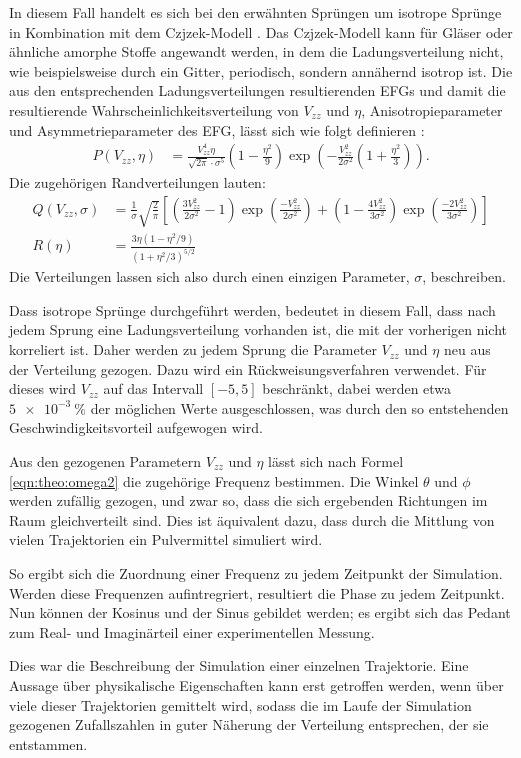 In diesem Fall handelt es sich bei den erwähnten Sprüngen um isotrope Sprünge in Kombination mit dem Czjzek-Modell \cite{czjzek_atomic_1981}. Das Czjzek-Modell kann für Gläser oder ähnliche amorphe Stoffe angewandt werden, in dem die Ladungsverteilung nicht, wie beispielsweise durch ein Gitter, periodisch, sondern annähernd isotrop ist. Die aus den entsprechenden Ladungsverteilungen resultierenden EFGs und damit die resultierende Wahrscheinlichkeitsverteilung von $V_{zz}$ und $\eta$, Anisotropieparameter und Asymmetrieparameter des EFG, lässt sich wie folgt definieren \cite{caer}:
\begin{align}
	P \left( V_{zz}, \eta \right) & = \frac{V_{zz}^4 \eta}{\sqrt{2 \pi} \cdot \sigma^5} \left( 1 - \frac{\eta^2}{9} \right)\exp \left( - \frac{V_{zz}^2}{2 \sigma^2} \left( 1 + \frac{\eta^2}{3} \right) \right). \label{eqn:sim:czjzek}
\end{align}
Die zugehörigen Randverteilungen lauten:
\begin{align}
    Q (V_{zz}, \sigma) &= \frac{1}{\sigma} \sqrt{\frac{2}{\pi}} \left[ \left( \frac{3 V_{zz}^2}{2 \sigma^2} - 1 \right) \exp{ \left( \frac{- V_{zz}^2}{2 \sigma^2} \right) } + \left( 1 - \frac{4 V_{zz}^2}{3 \sigma^2} \right) \exp{ \left( \frac{-2 V_{zz}^2}{3 \sigma^2} \right) } \right] \label{eqn:sim:czjzek_Q} \\
    R(\eta) &= \frac{3\eta (1 - \eta^2 / 9)}{(1 + \eta^2 / 3)^{5/2}} \label{eqn:sim:czjzek_R}
\end{align}
Die Verteilungen lassen sich also durch einen einzigen Parameter, $\sigma$, beschreiben.

Dass isotrope Sprünge durchgeführt werden, bedeutet in diesem Fall, dass nach jedem Sprung eine Ladungsverteilung vorhanden ist, die mit der vorherigen nicht korreliert ist. Daher werden zu jedem Sprung die Parameter $V_{zz}$ und $\eta$ neu aus der Verteilung gezogen. Dazu wird ein Rückweisungsverfahren verwendet. Für dieses wird $V_{zz}$ auf das Intervall $\left[-5, 5 \right]$ beschränkt, dabei werden etwa $\SI{5e-3}{\percent}$ der möglichen Werte ausgeschlossen, was durch den so entstehenden Geschwindigkeitsvorteil aufgewogen wird.

Aus den gezogenen Parametern $V_{zz}$ und $\eta$ lässt sich nach Formel \ref{eqn:theo:omega2} die zugehörige Frequenz bestimmen. Die Winkel $\theta$ und $\phi$ werden zufällig gezogen, und zwar so, dass die sich ergebenden Richtungen im Raum gleichverteilt sind. Dies ist äquivalent dazu, dass durch die Mittlung von vielen Trajektorien ein Pulvermittel simuliert wird.

So ergibt sich die Zuordnung einer Frequenz zu jedem Zeitpunkt der Simulation. Werden diese Frequenzen aufintregriert, resultiert die Phase zu jedem Zeitpunkt. Nun können der Kosinus und der Sinus gebildet werden; es ergibt sich das Pedant zum Real- und Imaginärteil einer experimentellen Messung. 

Dies war die Beschreibung der Simulation einer einzelnen Trajektorie. Eine Aussage über physikalische Eigenschaften kann erst getroffen werden, wenn über viele dieser Trajektorien gemittelt wird, sodass die im Laufe der Simulation gezogenen Zufallszahlen in guter Näherung der Verteilung entsprechen, der sie entstammen.
